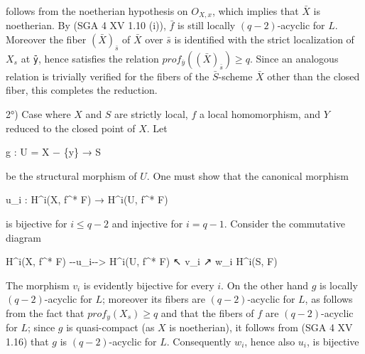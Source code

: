 \documentclass[
  11pt,
  a4paper,
]{book}
\newenvironment{Shaded}{}{}
\newcommand{\NormalTok}[1]{#1}
\begin{document}
follows from the noetherian hypothesis on \(O_{X,x}\), which implies
that \(\bar{X}\) is noetherian. By (SGA 4 XV 1.10 (i)), \(\bar{f}\) is
still locally \((q - 2)\)-acyclic for \(L\). Moreover the fiber
\((\bar{X})_{\bar{s}}\) of \(\bar{X}\) over \(\bar{s}\) is identified
with the strict localization of \(X_{s}\) at \texttt{ȳ}, hence satisfies
the relation \(prof_{\bar{y}}((\bar{X})_{\bar{s}}) \geqslant q\). Since
an analogous relation is trivially verified for the fibers of the
\(\bar{S}\)-scheme \(\bar{X}\) other than the closed fiber, this
completes the reduction.

2°) Case where \(X\) and \(S\) are strictly local, \(f\) a local
homomorphism, and \(Y\) reduced to the closed point of \(X\). Let

\begin{Shaded}
\begin{Highlighting}[]
\NormalTok{g : U = X − \{y\} → S}
\end{Highlighting}
\end{Shaded}

be the structural morphism of \(U\). One must show that the canonical
morphism

\begin{Shaded}
\begin{Highlighting}[]
\NormalTok{u\_i : H\^{}i(X, f\^{}* F) → H\^{}i(U, f\^{}* F)}
\end{Highlighting}
\end{Shaded}

is bijective for \(i \leqslant q - 2\) and injective for \(i = q - 1\).
Consider the commutative diagram

\begin{Shaded}
\begin{Highlighting}[]
\NormalTok{H\^{}i(X, f\^{}* F) {-}{-}u\_i{-}{-}\textgreater{} H\^{}i(U, f\^{}* F)}
\NormalTok{       ↖ v\_i           ↗ w\_i}
\NormalTok{          H\^{}i(S, F)}
\end{Highlighting}
\end{Shaded}

The morphism \(v_{i}\) is evidently bijective for every \(i\). On the
other hand \(g\) is locally \((q - 2)\)-acyclic for \(L\); moreover its
fibers are \((q - 2)\)-acyclic for \(L\), as follows from the fact that
\(prof_{y}(X_{s}) \geqslant q\) and that the fibers of \(f\) are
\((q - 2)\)-acyclic for \(L\); since \(g\) is quasi-compact (as \(X\) is
noetherian), it follows from (SGA 4 XV 1.16) that \(g\) is
\((q - 2)\)-acyclic for \(L\). Consequently \(w_{i}\), hence also
\(u_{i}\), is bijective
\end{document}
